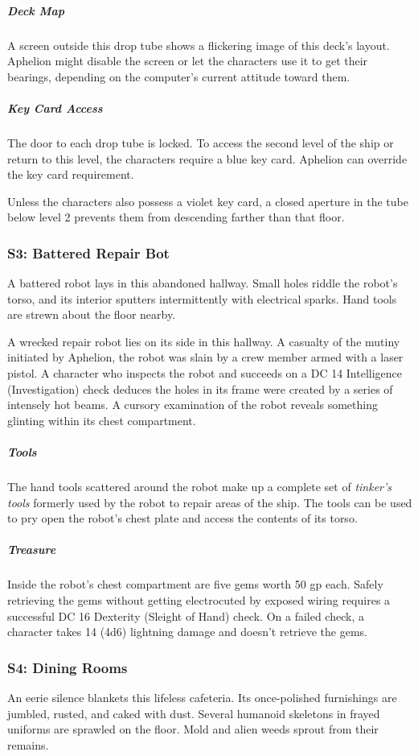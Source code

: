 \documentclass[10pt,a4paper,twoside,bg=print,twocolumn,openany,nodeprecatedcode]{dndbook}
\begin{document}
\subparagraph{Deck Map}
A screen outside this drop tube shows a flickering image of this deck's layout. Aphelion might disable the screen or let the characters use it to get their bearings, depending on the computer's current attitude toward them.

\subparagraph{Key Card Access}
The door to each drop tube is locked. To access the second level of the ship or return to this level, the characters require a blue key card. Aphelion can override the key card requirement.

Unless the characters also possess a violet key card, a closed aperture in the tube below level 2 prevents them from descending farther than that floor.

\subsubsection{S3: Battered Repair Bot}
\begin{DndReadAloud}{}
A battered robot lays in this abandoned hallway. Small holes riddle the robot's torso, and its interior sputters intermittently with electrical sparks. Hand tools are strewn about the floor nearby.

\end{DndReadAloud}

A wrecked repair robot lies on its side in this hallway. A casualty of the mutiny initiated by Aphelion, the robot was slain by a crew member armed with a laser pistol. A character who inspects the robot and succeeds on a DC 14 Intelligence (Investigation) check deduces the holes in its frame were created by a series of intensely hot beams. A cursory examination of the robot reveals something glinting within its chest compartment.

\subparagraph{Tools}
The hand tools scattered around the robot make up a complete set of \textit{tinker's tools} formerly used by the robot to repair areas of the ship. The tools can be used to pry open the robot's chest plate and access the contents of its torso.

\subparagraph{Treasure}
Inside the robot's chest compartment are five gems worth 50 gp each. Safely retrieving the gems without getting electrocuted by exposed wiring requires a successful DC 16 Dexterity (Sleight of Hand) check. On a failed check, a character takes 14 (4d6) lightning damage and doesn't retrieve the gems.

\subsubsection{S4: Dining Rooms}
\begin{DndReadAloud}{}
An eerie silence blankets this lifeless cafeteria. Its once-polished furnishings are jumbled, rusted, and caked with dust. Several humanoid skeletons in frayed uniforms are sprawled on the floor. Mold and alien weeds sprout from their remains.

\end{DndReadAloud}
\end{document}
